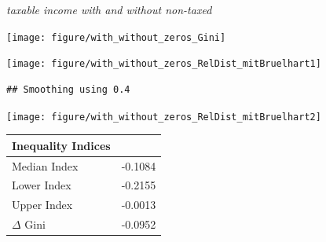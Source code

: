 \documentclass[twoside]{article}\usepackage[]{graphicx}\usepackage[]{color}
\makeatletter
\newenvironment{kframe}{%
 \def\at@end@of@kframe{}%
 \ifinner\ifhmode%
  \def\at@end@of@kframe{\end{minipage}}%
  \begin{minipage}{\columnwidth}%
 \fi\fi%
 \def\FrameCommand##1{\hskip\@totalleftmargin \hskip-\fboxsep
 \colorbox{shadecolor}{##1}\hskip-\fboxsep
     \hskip-\linewidth \hskip-\@totalleftmargin \hskip\columnwidth}%
 \MakeFramed {\advance\hsize-\width
   \@totalleftmargin\z@ \linewidth\hsize
   \@setminipage}}%
 {\par\unskip\endMakeFramed%
 \at@end@of@kframe}
\newenvironment{knitrout}{}{} %
\makeatother
\begin{document}
\begin{multicols}{2}
\emph{taxable income with and without non-taxed}




\begin{knitrout}
\color{fgcolor}
\texttt{[image: figure/with\_without\_zeros\_Gini]} 

\end{knitrout}


\begin{knitrout}
\color{fgcolor}
\texttt{[image: figure/with\_without\_zeros\_RelDist\_mitBruelhart1]} 
\begin{kframe}\begin{verbatim}
## Smoothing using 0.4
\end{verbatim}
\end{kframe}
\texttt{[image: figure/with\_without\_zeros\_RelDist\_mitBruelhart2]} 

\end{knitrout}


%
\begin{center}
\begin{tabular}{ll}
\hline\hline
\multicolumn{1}{l}{Inequality Indices}&\multicolumn{1}{c}{}\tabularnewline
\hline
Median Index&-0.1084\tabularnewline
Lower Index&-0.2155\tabularnewline
Upper Index&-0.0013\tabularnewline
$\Delta$ Gini&-0.0952\tabularnewline
\hline
\end{tabular}
\end{center}




\end{multicols}
\end{document}
